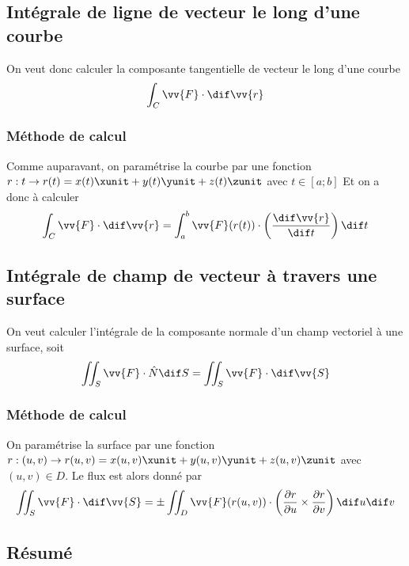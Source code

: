 \subsection{Intégrale de ligne de vecteur le long d'une courbe}

On veut donc calculer la composante tangentielle de vecteur le long d'une courbe
\[ \int_C \vv{F} \cdot \dif \vv{r} \]

\subsubsection{Méthode de calcul}

Comme auparavant, on paramétrise la courbe par une fonction $r : t \to r(t) = x(t) \xunit + y(t) \yunit + z(t) \zunit$ avec $t \in [a;b]$
Et on a donc à calculer
\[ \int_C \vv{F} \cdot \dif \vv{r} = \int_a^b \vv{F}(r(t)) \cdot \left(  \frac{\dif \vv{r}}{\dif t} \right) \dif t \]

\subsection{Intégrale de champ de vecteur à travers une surface}

On veut calculer l'intégrale de la composante normale d'un champ vectoriel à une surface, soit
\[ \iint_S \vv{F} \cdot \hat{N} \dif S = \iint_S \vv{F} \cdot \dif \vv{S} \]

\subsubsection{Méthode de calcul}

On paramétrise la surface par une fonction $r : (u,v) \to r(u,v) = x(u,v) \xunit + y(u,v) \yunit + z(u,v) \zunit$ avec $(u,v) \in D$. Le flux est alors donné par
\[ \iint_S \vv{F} \cdot \dif \vv{S} = \pm \iint_D \vv{F}(r(u,v)) \cdot \left( \frac{\pa r}{\pa u} \times \frac{\pa r}{\pa v} \right) \dif u \dif v \]

\subsection{Résumé}

